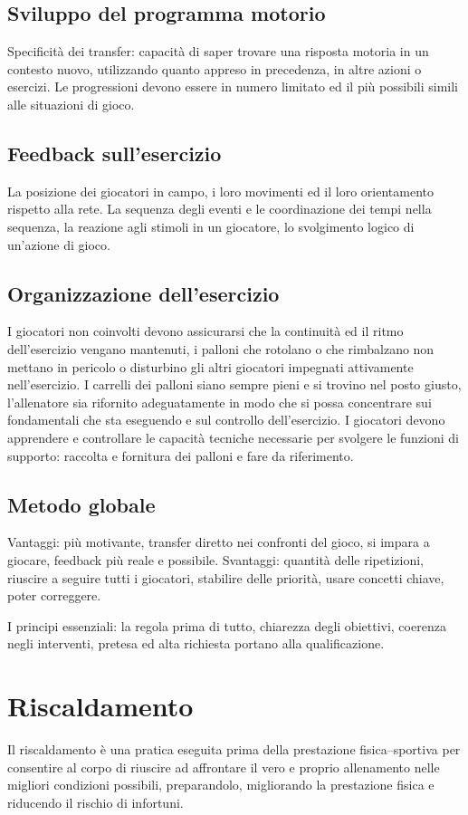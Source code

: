 \subsection{Sviluppo del programma motorio}
Specificità dei transfer: capacità di saper trovare una risposta motoria in un contesto nuovo, utilizzando quanto appreso in precedenza, in altre azioni o esercizi.
Le progressioni devono essere in numero limitato ed il più possibili simili alle situazioni di gioco.

\subsection{Feedback sull'esercizio}
La posizione dei giocatori in campo, i loro movimenti ed il loro orientamento rispetto alla rete.
La sequenza degli eventi e le coordinazione dei tempi nella sequenza, la reazione agli stimoli in un giocatore, lo svolgimento logico di un'azione di gioco.

\subsection{Organizzazione dell'esercizio}
I giocatori non coinvolti devono assicurarsi che la continuità ed il ritmo dell'esercizio vengano mantenuti, i palloni che rotolano o che rimbalzano non mettano in pericolo o disturbino gli altri giocatori impegnati attivamente nell'esercizio. I carrelli dei palloni siano sempre pieni e si trovino nel posto giusto, l'allenatore sia rifornito adeguatamente in modo che si possa concentrare sui fondamentali che sta eseguendo e sul controllo dell'esercizio.
I giocatori devono apprendere e controllare le capacità tecniche necessarie per svolgere le funzioni di supporto: raccolta e fornitura dei palloni e fare da riferimento.

\subsection{Metodo globale}
Vantaggi: più motivante, transfer diretto nei confronti del gioco, si impara a giocare, feedback più reale e possibile. 
Svantaggi: quantità delle ripetizioni, riuscire a seguire tutti i giocatori, stabilire delle priorità, usare concetti chiave, poter correggere.

I principi essenziali:
la regola prima di tutto,
chiarezza degli obiettivi,
coerenza negli interventi,
pretesa ed alta richiesta portano alla qualificazione.

\section{Riscaldamento}
Il riscaldamento è una pratica eseguita prima della prestazione fisica--sportiva per consentire al corpo di riuscire ad affrontare il vero e proprio allenamento nelle migliori condizioni possibili, preparandolo, migliorando la prestazione fisica e riducendo il rischio di infortuni.


